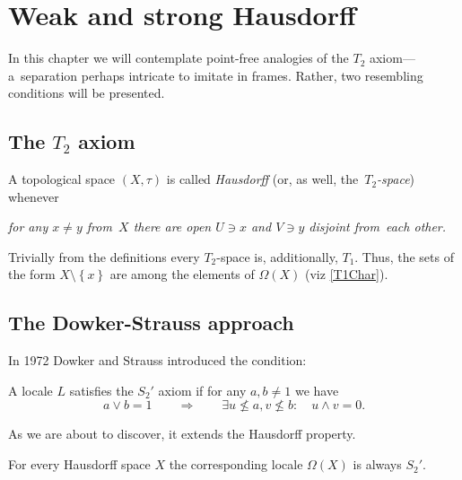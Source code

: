 \chapter{Weak and strong Hausdorff}

In this chapter we will contemplate point-free analogies of the $T_2$
axiom---a~separation perhaps intricate to imitate in frames.
Rather, two resembling conditions will be presented.

\section{The $T_2$ axiom}

\begin{framed}
  \begin{df}[$T_2$]
    A topological space $(X, \tau)$ is called \emph{Hausdorff\/} (or, as well,
    the~\emph{$T_2$-space\/}) whenever
    \begin{center} \it
      for any $x \ne y$ from~$X$ there are open $U\owns x$ and $V\owns y$
      disjoint from~each other.
    \end{center}
  \end{df}
\end{framed}

\begin{rem} \label{T2->T1}
  Trivially from the definitions every $T_2$-space is, additionally, $T_1$.
  Thus, the sets of the form $X\setminus \left\{x\right\}$ are among the
  elements of $\Omega(X)$ (viz \ref{T1Char}).
\end{rem}

\section{The Dowker-Strauss approach}

In 1972 Dowker and Strauss \cite{ds72} introduced the condition:

\begin{framed}
  \begin{df}[$S_2'$]
    A locale $L$ satisfies the $S_2'$ axiom if for any $a, b \ne 1$ we have
    \[
      a \vee b = 1 \qquad \Rightarrow \qquad \exists u\not\leq a, v\not\leq
      b: \quad u \wedge v = 0.
    \]
  \end{df}
\end{framed}

As we are about to discover, it extends the Hausdorff property.

\begin{prop} \label{Haus->S2'}
  For every Hausdorff space $X$ the corresponding locale $\Omega(X)$ is always
  $S_2'$.
\end{prop}

